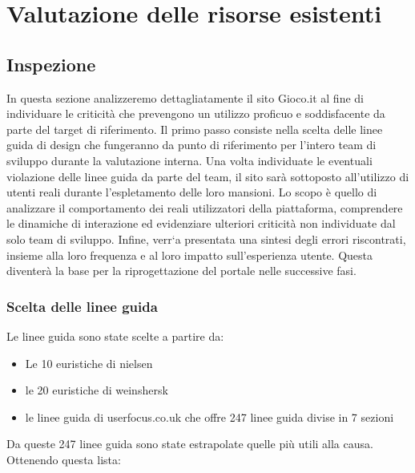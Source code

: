 \documentclass[../Report.tex]{subfiles}
\begin{document}
    \chapter{Valutazione delle risorse esistenti}
    \section{Inspezione}
    In questa sezione analizzeremo dettagliatamente il sito Gioco.it al fine di individuare le criticità che prevengono un utilizzo proficuo e soddisfacente da parte del target di riferimento. Il primo passo consiste nella scelta delle linee guida di design che fungeranno da punto di riferimento per l’intero team di sviluppo durante la valutazione interna. Una volta individuate le eventuali violazione delle linee guida da parte del team, il sito sarà sottoposto all’utilizzo di utenti reali durante l’espletamento delle loro mansioni. Lo scopo è quello di analizzare il comportamento dei reali utilizzatori della piattaforma, comprendere le dinamiche di interazione ed evidenziare ulteriori criticità non individuate dal solo team di sviluppo. Infine, verr`a presentata una sintesi degli errori riscontrati, insieme alla loro frequenza e al loro impatto sull’esperienza utente. Questa diventerà la base per la riprogettazione del portale nelle successive fasi. 

    \subsection{Scelta delle linee guida}
    Le linee guida sono state scelte a partire da:
    \begin{itemize}
        \item Le 10 euristiche di nielsen 
        \item le 20 euristiche di weinshersk
        \item le linee guida di userfocus.co.uk che offre 247 linee guida divise in 7 sezioni
    \end{itemize}

    Da queste 247 linee guida sono state estrapolate quelle più utili alla causa. Ottenendo questa lista:
\end{document}

